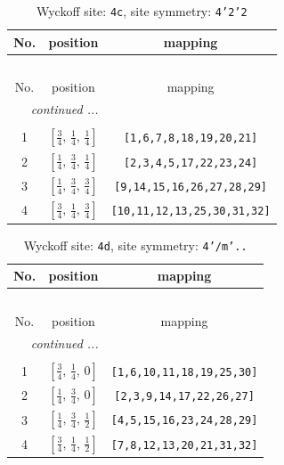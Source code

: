 \documentclass[fleqn,8pt]{jsarticle}
\begin{document}
\renewcommand{\arraystretch}{1.2}
\begin{longtable}{ccc}
\caption{Wyckoff site: {\tt 4c}, site symmetry: {\tt 4'2'2}}
 \\
 \hline \hline
No. & position & mapping \\ \hline \endfirsthead

\multicolumn{2}{l}{\tablename\ \thetable{}} \\
 \hline \hline
No. & position & mapping \\ \hline \endhead

 \hline \hline
\multicolumn{2}{r}{\footnotesize\it continued ...} \\ \endfoot

 \hline \hline
\multicolumn{2}{r}{} \\ \endlastfoot

1 & $\left[ \frac{3}{4},\, \frac{1}{4},\, \frac{1}{4} \right]$ & {\tt [1,6,7,8,18,19,20,21]} \\ \hline
2 & $\left[ \frac{1}{4},\, \frac{3}{4},\, \frac{1}{4} \right]$ & {\tt [2,3,4,5,17,22,23,24]} \\ \hline
3 & $\left[ \frac{1}{4},\, \frac{3}{4},\, \frac{3}{4} \right]$ & {\tt [9,14,15,16,26,27,28,29]} \\ \hline
4 & $\left[ \frac{3}{4},\, \frac{1}{4},\, \frac{3}{4} \right]$ & {\tt [10,11,12,13,25,30,31,32]} \\
\end{longtable}
\renewcommand{\arraystretch}{1.2}
\begin{longtable}{ccc}
\caption{Wyckoff site: {\tt 4d}, site symmetry: {\tt 4'/m'..}}
 \\
 \hline \hline
No. & position & mapping \\ \hline \endfirsthead

\multicolumn{2}{l}{\tablename\ \thetable{}} \\
 \hline \hline
No. & position & mapping \\ \hline \endhead

 \hline \hline
\multicolumn{2}{r}{\footnotesize\it continued ...} \\ \endfoot

 \hline \hline
\multicolumn{2}{r}{} \\ \endlastfoot

1 & $\left[ \frac{3}{4},\, \frac{1}{4},\, 0 \right]$ & {\tt [1,6,10,11,18,19,25,30]} \\ \hline
2 & $\left[ \frac{1}{4},\, \frac{3}{4},\, 0 \right]$ & {\tt [2,3,9,14,17,22,26,27]} \\ \hline
3 & $\left[ \frac{1}{4},\, \frac{3}{4},\, \frac{1}{2} \right]$ & {\tt [4,5,15,16,23,24,28,29]} \\ \hline
4 & $\left[ \frac{3}{4},\, \frac{1}{4},\, \frac{1}{2} \right]$ & {\tt [7,8,12,13,20,21,31,32]} \\
\end{longtable}
\end{document}
